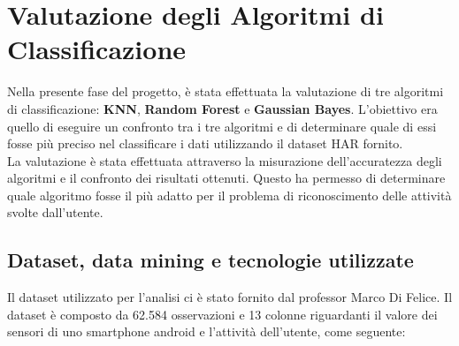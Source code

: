 \documentclass[../../Report.tex]{subfiles}
\begin{document}
\chapter{Valutazione degli Algoritmi di Classificazione}
Nella presente fase del progetto, è stata effettuata la valutazione di tre algoritmi di classificazione: \textbf{KNN}, \textbf{Random Forest} e \textbf{Gaussian Bayes}. L'obiettivo era quello di eseguire un confronto tra i tre algoritmi e di determinare quale di essi fosse più preciso nel classificare i dati utilizzando il dataset HAR fornito.\\
La valutazione è stata effettuata attraverso la misurazione dell'accuratezza degli algoritmi e il confronto dei risultati ottenuti. Questo ha permesso di determinare quale algoritmo fosse il più adatto per il problema di riconoscimento delle attività svolte dall'utente.\\   

\section{Dataset, data mining e tecnologie utilizzate}
Il dataset utilizzato per l'analisi ci è stato fornito dal professor Marco Di Felice. Il dataset è composto da 62.584 osservazioni e 13 colonne riguardanti il valore dei sensori di uno smartphone android e l'attività dell'utente, come seguente:
\end{document}
